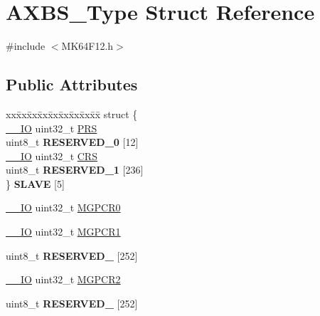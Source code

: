 \hypertarget{structAXBS__Type}{}\section{A\+X\+B\+S\+\_\+\+Type Struct Reference}
\label{structAXBS__Type}


{\ttfamily \#include $<$M\+K64\+F12.\+h$>$}

\subsection*{Public Attributes}
\begin{DoxyCompactItemize}
\item 
\begin{tabbing}
xx\=xx\=xx\=xx\=xx\=xx\=xx\=xx\=xx\=\kill
struct \{\\
\>\hyperlink{core__sc300_8h_aec43007d9998a0a0e01faede4133d6be}{\_\_IO} uint32\_t \hyperlink{structAXBS__Type_a5fcaf70cb286f5b3bb78e2ba616586c1}{PRS}\\
\>uint8\_t {\bfseries RESERVED\_0} \mbox{[}12\mbox{]}\\
\>\hyperlink{core__sc300_8h_aec43007d9998a0a0e01faede4133d6be}{\_\_IO} uint32\_t \hyperlink{structAXBS__Type_a903f1ae9006bf6e28d76a210abcb5453}{CRS}\\
\>uint8\_t {\bfseries RESERVED\_1} \mbox{[}236\mbox{]}\\
\} {\bfseries SLAVE} \mbox{[}5\mbox{]}\hypertarget{structAXBS__Type_a4d638292591de61f9cb85a24dbf0ed1c}{}\label{structAXBS__Type_a4d638292591de61f9cb85a24dbf0ed1c}
\\

\end{tabbing}\item 
\hyperlink{core__sc300_8h_aec43007d9998a0a0e01faede4133d6be}{\+\_\+\+\_\+\+IO} uint32\+\_\+t \hyperlink{structAXBS__Type_a643715e4038413e9612431b95ddadd9a}{M\+G\+P\+C\+R0}
\item 
\hyperlink{core__sc300_8h_aec43007d9998a0a0e01faede4133d6be}{\+\_\+\+\_\+\+IO} uint32\+\_\+t \hyperlink{structAXBS__Type_afe183bfafdb2d0413e52e10d870f7024}{M\+G\+P\+C\+R1}
\item 
uint8\+\_\+t {\bfseries R\+E\+S\+E\+R\+V\+E\+D\+\_} \mbox{[}252\mbox{]}\hypertarget{structAXBS__Type_af3d21a8645fc8449e512b18a50f95dad}{}\label{structAXBS__Type_af3d21a8645fc8449e512b18a50f95dad}

\item 
\hyperlink{core__sc300_8h_aec43007d9998a0a0e01faede4133d6be}{\+\_\+\+\_\+\+IO} uint32\+\_\+t \hyperlink{structAXBS__Type_aade04fd9f32d87eceee3597d50420f04}{M\+G\+P\+C\+R2}
\item 
uint8\+\_\+t {\bfseries R\+E\+S\+E\+R\+V\+E\+D\+\_} \mbox{[}252\mbox{]}\hypertarget{structAXBS__Type_af61c99e50506b17255d606e8351823ca}{}\label{structAXBS__Type_af61c99e50506b17255d606e8351823ca}


\end{DoxyCompactItemize}
